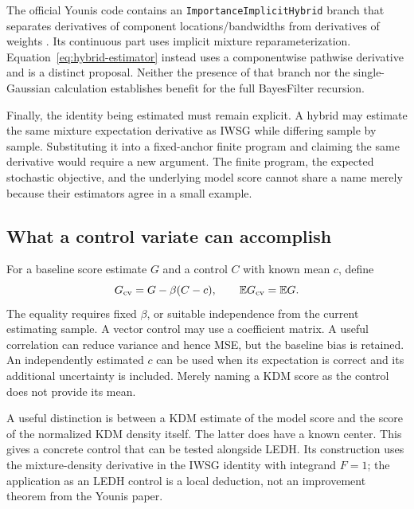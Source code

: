 \documentclass[11pt]{article}
\begin{document}
The official Younis code contains an
\texttt{ImportanceImplicitHybrid} branch that separates derivatives of
component locations/bandwidths from derivatives of weights
\citep{youniscode2023}. Its continuous part uses implicit mixture
reparameterization. Equation~\eqref{eq:hybrid-estimator} instead uses a
componentwise pathwise derivative and is a distinct proposal. Neither the
presence of that branch nor the single-Gaussian calculation establishes
benefit for the full BayesFilter recursion.

Finally, the identity being estimated must remain explicit. A hybrid may
estimate the same mixture expectation derivative as IWSG while differing
sample by sample. Substituting it into a fixed-anchor finite program and
claiming the same derivative would require a new argument. The finite
program, the expected stochastic objective, and the underlying model score
cannot share a name merely because their estimators agree in a small example.

\subsection{What a control variate can accomplish}

For a baseline score estimate $G$ and a control $C$ with known mean $c$, define
\begin{equation}
 G_{\rm cv}=G-\beta(C-c),\qquad
 \mathbb E G_{\rm cv}=\mathbb E G.
 \label{eq:score-control-variate}
\end{equation}
The equality requires fixed $\beta$, or suitable independence from the
current estimating sample. A vector control may use a coefficient matrix.
A useful correlation can reduce variance and hence MSE, but the baseline
bias is retained. An independently estimated $c$ can be used when its
expectation is correct and its additional uncertainty is included. Merely
naming a KDM score as the control does not provide its mean.

A useful distinction is between a KDM estimate of the model score and the
score of the normalized KDM density itself. The latter does have a known
center. This gives a concrete control that can be tested alongside LEDH.
Its construction uses the mixture-density derivative in the IWSG identity
with integrand $F=1$; the application as an LEDH control is a local deduction,
not an improvement theorem from the Younis paper.
\end{document}
